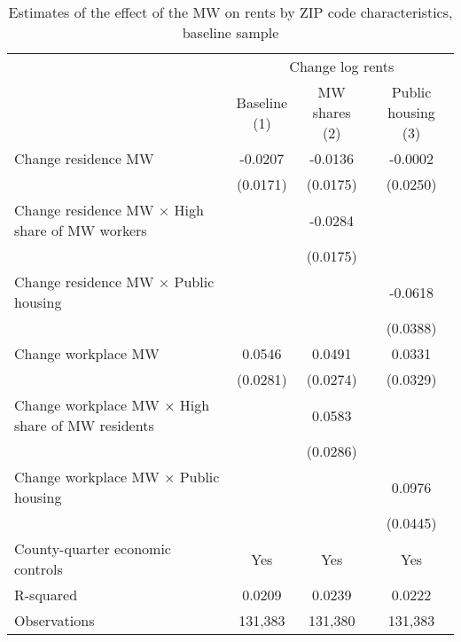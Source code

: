 \begin{table}[hbt!] \centering
    \caption{Estimates of the effect of the MW on rents by ZIP code characteristics, baseline sample}
    \label{tab:heterogeneity}
    \begin{tabular}{@{}lccc@{}}
        \toprule
            & \multicolumn{3}{c}{Change log rents}                                                  \\ \cmidrule(l){2-4} 
            & \shortstack{Baseline\\(1)} 
            & \shortstack{MW shares\\(2)}                                             
            & \shortstack{Public housing\\(3)}                                                      \\ \midrule
        Change residence MW                                     &  -0.0207   &  -0.0136  &  -0.0002   \\
                                                                & (0.0171)  & (0.0175) & (0.0250)  \\
        Change residence MW $\times$ High share of MW workers   &        &  -0.0284  &        \\
                                                                &        & (0.0175) &        \\
        Change residence MW $\times$ Public housing             &        &       &  -0.0618   \\
                                                                &        &       & (0.0388)  \\
        Change workplace MW                                     &  0.0546   &  0.0491  &  0.0331   \\
                                                                & (0.0281)  & (0.0274) & (0.0329)  \\
        Change workplace MW $\times$ High share of MW residents &        &  0.0583  &        \\
                                                                &        & (0.0286) &        \\
        Change workplace MW $\times$ Public housing             &        &       &  0.0976   \\
                                                                &        &       & (0.0445)  \\
        County-quarter economic controls                        &  Yes   &  Yes  &   Yes  \\
        R-squared                                               &  0.0209   &  0.0239  &   0.0222  \\
        Observations                                            &  131,383  &  131,380 &   131,383 \\ \bottomrule
    \end{tabular}


\end{table}
